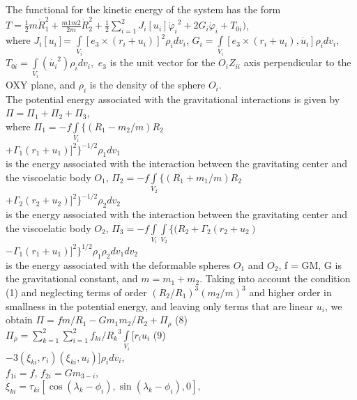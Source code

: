 \documentclass[fontsize = 11pt,a4paper]{article}
\begin{document}
\pagebreak
\begin{multicols}{2}
The functional for the kinetic energy of the system
has the form
$T = \frac{1}{2}m{\dot{R}^2_1} + \frac{m1m2}{2m}{\dot{R}^2_2} + \frac{1}{2}\sum_{i=1}^{2}{J_i}[{u_i}]{\dot{\varphi}_i}^2 + 2{G_i}{\dot{\varphi}_i}+{T_{0i}})$,
\\ where 
${J_i}[{u_i}] $= $\int\limits_{V_i} [{e_3}\times ({r_i} + {u_i})]^2 {\rho_i}d{v_i}$,
${G_i} = \int\limits_{V_i}[{e_3} \times ({r_i} + {u_i}),\dot{{u_i}}]{\rho_i}d{v_i}, $
${T_{0i}} = \int\limits_{V_i} (\dot{{u_i}}^2) {\rho_i} d {v_i},$
${e_3}$ is the unit vector for the $O_i Z_{ii}$ axis perpendicular
to the OXY plane, and ${\rho_i}$ is the density of the sphere
$O_i$.\\
The potential energy associated with the gravitational interactions is given by\\
$\Pi=\Pi_1 + \Pi_2 + \Pi_3$, \\
where $\Pi_1 = -f \int\limits_{V_i} \{(R_1 - m_2/m)R_2$ \\
$+\Gamma_1 (r_1 + u_1)]^2\}^{-1/2}\rho_1 d v_1$\\
is the energy associated with the interaction between
the gravitating center and the viscoelatic body $O_1$,
$\Pi_2 = -f \int\limits_{V_2} \{(R_1 + m_1/m)R_2$ \\
$+\Gamma_2 (r_2 + u_2)]^2\}^{-1/2}\rho_2 d v_2$\\
is the energy associated with the interaction between
the gravitating center and the viscoelatic body $O_2$,
$\Pi_3 = -f  \int\limits_{V_i}\int\limits_{V_2} \{(R_2 +\Gamma_2(r_2 + u_2)$ \\
$-\Gamma_1 (r_1 + u_1)]^2\}^{1/2}\rho_1\rho_2 d v_1d v_2$\\
is the energy associated with the deformable spheres
$O_1$ and $O_2$, f = GM, G is the gravitational constant,
and $m = m_1 + m_2$. Taking into account the condition
(1) and neglecting terms of order $(R_2/R_1)^3(m_2/m)^3$
and higher order in smallness in the potential energy,
and leaving only terms that are linear $u_i$, we obtain
$\Pi = fm/R_1 - G{m_1}{m_2}/R_2 + {\Pi _\rho}$ (8)\\
$\Pi_\rho = \sum\limits_{k=1}^{2} \sum\limits_{i=1}^{2} f_{ki}/ {R_k}^3\int\limits_{V_i}[{r_i}{u_i}$ (9) \\
$-3(\xi_{ki},r_i)(\xi_{ki},u_i)]\rho_idv_i$,\\
$f_{1i} = f$,   $f_{2i} = Gm_{3-i}$, \\
$\xi_{ki} = \tau_{ki}[\cos(\lambda_k - \phi_i),\sin(\lambda_k - \phi_i),0],$\\

\end{multicols}
\end{document}
